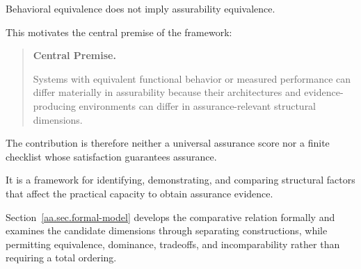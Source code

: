 Behavioral equivalence does not imply assurability equivalence.

This motivates the central premise of the framework:

\begin{quote}
  \textbf{Central Premise.}

  Systems with equivalent functional behavior or measured
  performance can differ materially in assurability because
  their architectures and evidence-producing environments
  can differ in assurance-relevant structural dimensions.
\end{quote}

The contribution is therefore neither a universal assurance score
nor a finite checklist whose satisfaction guarantees assurance.

It is a framework for identifying, demonstrating, and comparing
structural factors that affect the practical capacity to obtain
assurance evidence.

Section~\ref{aa.sec.formal-model} develops the comparative relation
formally and examines the candidate dimensions through separating
constructions, while permitting equivalence, dominance, tradeoffs,
and incomparability rather than requiring a total ordering.
